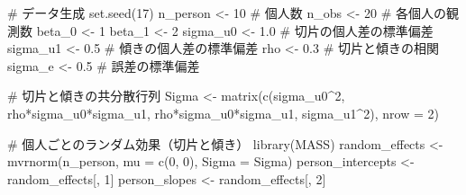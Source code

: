 \documentclass[
  a4paper,
]{ltjsbook}
\newenvironment{Shaded}{\begin{snugshade}}{\end{snugshade}}
\newcommand{\AttributeTok}[1]{\textcolor[rgb]{0.40,0.45,0.13}{#1}}
\newcommand{\CommentTok}[1]{\textcolor[rgb]{0.37,0.37,0.37}{#1}}
\newcommand{\DecValTok}[1]{\textcolor[rgb]{0.68,0.00,0.00}{#1}}
\newcommand{\FloatTok}[1]{\textcolor[rgb]{0.68,0.00,0.00}{#1}}
\newcommand{\FunctionTok}[1]{\textcolor[rgb]{0.28,0.35,0.67}{#1}}
\newcommand{\NormalTok}[1]{\textcolor[rgb]{0.00,0.23,0.31}{#1}}
\newcommand{\OtherTok}[1]{\textcolor[rgb]{0.00,0.23,0.31}{#1}}
\newcommand{\SpecialCharTok}[1]{\textcolor[rgb]{0.37,0.37,0.37}{#1}}
\begin{document}
\begin{Shaded}
\begin{Highlighting}[]
\CommentTok{\# データ生成}
\FunctionTok{set.seed}\NormalTok{(}\DecValTok{17}\NormalTok{)}
\NormalTok{n\_person }\OtherTok{\textless{}{-}} \DecValTok{10}  \CommentTok{\# 個人数}
\NormalTok{n\_obs }\OtherTok{\textless{}{-}} \DecValTok{20}     \CommentTok{\# 各個人の観測数}
\NormalTok{beta\_0 }\OtherTok{\textless{}{-}} \DecValTok{1}
\NormalTok{beta\_1 }\OtherTok{\textless{}{-}} \DecValTok{2}
\NormalTok{sigma\_u0 }\OtherTok{\textless{}{-}} \FloatTok{1.0}  \CommentTok{\# 切片の個人差の標準偏差}
\NormalTok{sigma\_u1 }\OtherTok{\textless{}{-}} \FloatTok{0.5}  \CommentTok{\# 傾きの個人差の標準偏差}
\NormalTok{rho }\OtherTok{\textless{}{-}} \FloatTok{0.3}       \CommentTok{\# 切片と傾きの相関}
\NormalTok{sigma\_e }\OtherTok{\textless{}{-}} \FloatTok{0.5}   \CommentTok{\# 誤差の標準偏差}

\CommentTok{\# 切片と傾きの共分散行列}
\NormalTok{Sigma }\OtherTok{\textless{}{-}} \FunctionTok{matrix}\NormalTok{(}\FunctionTok{c}\NormalTok{(sigma\_u0}\SpecialCharTok{\^{}}\DecValTok{2}\NormalTok{, rho}\SpecialCharTok{*}\NormalTok{sigma\_u0}\SpecialCharTok{*}\NormalTok{sigma\_u1, }
\NormalTok{                  rho}\SpecialCharTok{*}\NormalTok{sigma\_u0}\SpecialCharTok{*}\NormalTok{sigma\_u1, sigma\_u1}\SpecialCharTok{\^{}}\DecValTok{2}\NormalTok{), }
                \AttributeTok{nrow =} \DecValTok{2}\NormalTok{)}

\CommentTok{\# 個人ごとのランダム効果（切片と傾き）}
\FunctionTok{library}\NormalTok{(MASS)}
\NormalTok{random\_effects }\OtherTok{\textless{}{-}} \FunctionTok{mvrnorm}\NormalTok{(n\_person, }\AttributeTok{mu =} \FunctionTok{c}\NormalTok{(}\DecValTok{0}\NormalTok{, }\DecValTok{0}\NormalTok{), }\AttributeTok{Sigma =}\NormalTok{ Sigma)}
\NormalTok{person\_intercepts }\OtherTok{\textless{}{-}}\NormalTok{ random\_effects[, }\DecValTok{1}\NormalTok{]}
\NormalTok{person\_slopes }\OtherTok{\textless{}{-}}\NormalTok{ random\_effects[, }\DecValTok{2}\NormalTok{]}


\end{Highlighting}
\end{Shaded}
\end{document}
